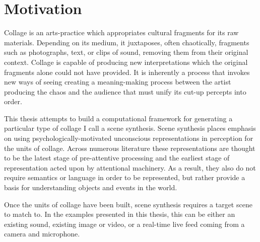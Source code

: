 \documentclass[a4paper,10pt,final]{ThesisStyle}
\begin{document}
\section{Motivation}



Collage is an arts-practice which appropriates cultural fragments for its raw materials.  Depending on its medium, it juxtaposes, often chaotically, fragments such as photographs, text, or clips of sound, removing them from their original context.  Collage is capable of producing new interpretations which the original fragments alone could not have provided.  It is inherently a process that invokes new ways of seeing creating a meaning-making process between the artist producing the chaos and the audience that must unify its cut-up percepts into order.  %


This thesis attempts to build a computational framework for generating a particular type of collage I call a scene synthesis.  Scene synthesis places emphasis on using psychologically-motivated unconscious representations in perception for the units of collage.  Across numerous literature these representations are thought to be the latest stage of pre-attentive processing and the earliest stage of representation acted upon by attentional machinery.  As a result, they also do not require semantics or language in order to be represented, but rather provide a basis for understanding objects and events in the world.  

Once the units of collage have been built, scene synthesis requires a target scene to match to.  In the examples presented in this thesis, this can be either an existing sound, existing image or video, or a real-time live feed coming from a camera and microphone.   

\end{document}
